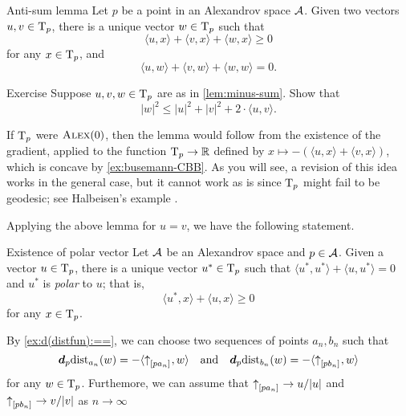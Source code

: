 \begin{thm}{Anti-sum lemma}\label{lem:minus-sum} 
Let $p$ be a point in an Alexandrov space $\mathcal{A}$.
Given two vectors $u,v\in \mathrm{T}_p$, there is a unique vector $w\in \mathrm{T}_p$ such that
\[\langle u,x\rangle +\langle v,x\rangle +\langle w,x\rangle \ge 0\]
for any $x\in \mathrm{T}_p$, and
\[\langle u,w\rangle +\langle v,w\rangle +\langle w,w\rangle =0.\]

\end{thm}

\begin{thm}{Exercise}\label{ex:|antisum|}
Suppose $u,v, w\in \mathrm{T}_p$ are as in \ref{lem:minus-sum}.
Show that 
\[|w|^2\le |u|^2+|v|^2+2\cdot\langle u,v\rangle.\]

\end{thm}

If $\mathrm{T}_p$ were $\textsc{Alex}(0)$, then the lemma would follow from the existence  of the gradient, applied to the function $\mathrm{T}_p\to \mathbb{R}$ defined by $x\mapsto -(\langle u,x\rangle +\langle v,x\rangle )$, which is concave by \ref{ex:busemann-CBB}.
As you will see, a revision of this idea works in the general case, but it cannot work as is since $\mathrm{T}_p$ might fail to be geodesic; see Halbeisen's example \cite[13.6]{alexander-kapovitch-petrunin2024}.

Applying the above lemma for $u=v$, we have the following statement.

\begin{thm}{Existence of polar vector}\label{cor:polar}
Let $\mathcal{A}$ be an Alexandrov space 
and $p\in \mathcal{A}$. 
Given a vector $u\in \mathrm{T}_p$,  there is a unique vector $u^*\in\mathrm{T}_p$ such that $\langle u^*,u^*\rangle +\langle u,u^*\rangle = 0$ and
$u^*$ is \emph{polar} to $u$;
that is,
\[\langle u^*,x\rangle +\langle u,x\rangle \ge 0\]
for any $x\in \mathrm{T}_p$.
\end{thm}

By \ref{ex:d(distfun):==}, we can choose two sequences of points $a_n,b_n$ such that 
\[
\bm{d}_p\mathrm{dist}_{a_n}(w)=-\langle{\uparrow}_{[{p}{a_n}]_{{}}},w\rangle
\quad\text{and}\quad
\bm{d}_p\mathrm{dist}_{b_n}(w)=-\langle{\uparrow}_{[{p}{b_n}]_{{}}},w\rangle
\]
for any $w\in\mathrm{T}_p$.
Furthemore, we can assume that ${\uparrow}_{[{p}{a_n}]_{{}}}\to u/|u|$ and ${\uparrow}_{[{p}{b_n}]_{{}}}\to v/|v|$ as $n\to \infty$

